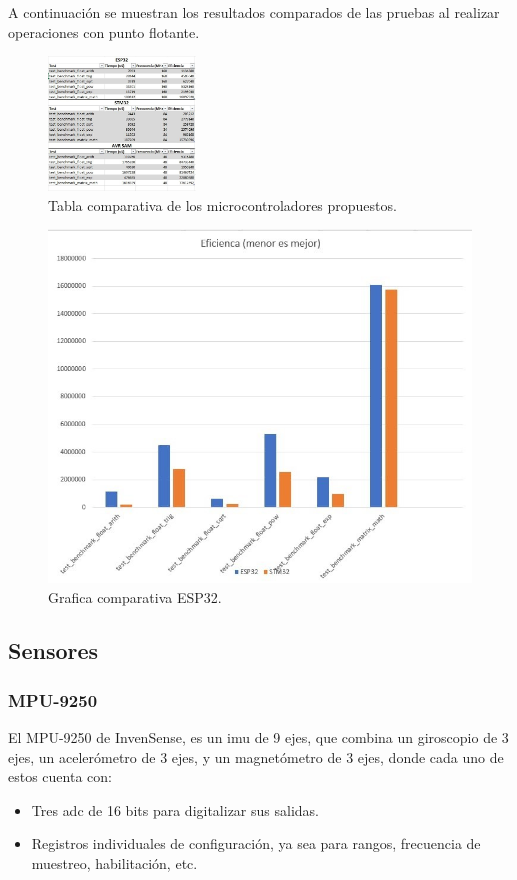 A continuación se muestran los resultados comparados de las pruebas al realizar operaciones con punto flotante.
\begin{figure}[htp!]
    \centering
    \includegraphics[width=0.35\textwidth]{benchmark_table_esp32.jpg}
    \caption{Tabla comparativa de los microcontroladores propuestos.}
    \label{fig: table_benchmark}
\end{figure}
\FloatBarrier

\begin{figure}[htp!]
    \centering
    \includegraphics[width=\columnwidth]{benchmark_graphic_esp32.jpg}
    \caption{Grafica comparativa ESP32.}
    \label{fig: graphic_benchmark}
\end{figure}
\FloatBarrier

\subsection{Sensores}
\subsubsection{MPU-9250}
El MPU-9250 de InvenSense, es un \acrshort{imu} de 9 ejes, que combina
un giroscopio de 3 ejes, un acelerómetro de 3 ejes, y un magnetómetro de 3 ejes, donde cada
uno de estos cuenta con:
\begin{itemize}
    \item Tres \acrshort{adc} de 16 bits para digitalizar sus salidas.
    \item Registros individuales de configuración, ya sea para rangos, frecuencia de muestreo, habilitación, etc.
\end{itemize}

